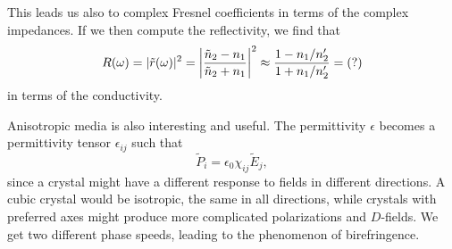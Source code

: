 This leads us also to complex Fresnel coefficients in terms of the complex impedances. If we then compute the reflectivity, we find that
\begin{equation}
    R(\omega) =|\tilde r(\omega)|^2 = \abs*{\frac{\tilde n_2 - n_1}{\tilde n_2+n_1}}^2 \approx \frac{1-n_1/n_2'}{1+n_1/n_2'}=(?)
\end{equation}
in terms of the conductivity.

Anisotropic media is also interesting and useful. The permittivity $\epsilon$ becomes a permittivity tensor $\epsilon_{ij}$ such that
\begin{equation}
    \tilde P_i = \epsilon_0 \chi_{ij} \tilde E_j,
\end{equation}
since a crystal might have a different response to fields in different directions. A cubic crystal would be isotropic, the same in all directions, while crystals with preferred axes might produce more complicated polarizations and $D$-fields. We get two different phase speeds, leading to the phenomenon of birefringence.